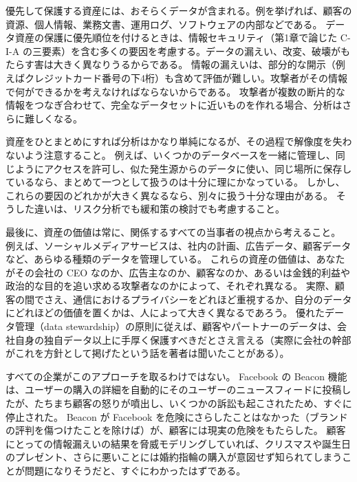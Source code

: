 \documentclass[uplatex]{jsarticle}
\def\label#1{}%
\begin{document}
優先して保護する資産には、おそらくデータが含まれる。例を挙げれば、顧客の資源、個人情報、業務文書、運用ログ、ソフトウェアの内部などである。
データ資産の保護に優先順位を付けるときは、情報セキュリティ（第1章で論じた C-I-A の三要素）を含む多くの要因を考慮する。データの漏えい、改変、破壊がもたらす害は大きく異なりうるからである。
情報の漏えいは、部分的な開示（例えばクレジットカード番号の下4桁）も含めて評価が難しい。攻撃者がその情報で何ができるかを考えなければならないからである。
攻撃者が複数の断片的な情報をつなぎ合わせて、完全なデータセットに近いものを作れる場合、分析はさらに難しくなる。

資産をひとまとめにすれば分析はかなり単純になるが、その過程で解像度を失わないよう注意すること。
例えば、いくつかのデータベースを一緒に管理し、同じようにアクセスを許可し、似た発生源からのデータに使い、同じ場所に保存しているなら、まとめて一つとして扱うのは十分に理にかなっている。
しかし、これらの要因のどれかが大きく異なるなら、別々に扱う十分な理由がある。
そうした違いは、リスク分析でも緩和策の検討でも考慮すること。

最後に、資産の価値は常に、関係するすべての当事者の視点から考えること。
例えば、ソーシャルメディアサービスは、社内の計画、広告データ、顧客データなど、あらゆる種類のデータを管理している。
これらの資産の価値は、あなたがその会社の CEO なのか、広告主なのか、顧客なのか、あるいは金銭的利益や政治的な目的を追い求める攻撃者なのかによって、それぞれ異なる。
実際、顧客の間でさえ、通信におけるプライバシーをどれほど重視するか、自分のデータにどれほどの価値を置くかは、人によって大きく異なるであろう。
優れたデータ管理（data stewardship）の原則に従えば、顧客やパートナーのデータは、会社自身の独自データ以上に手厚く保護すべきだとさえ言える（実際に会社の幹部がこれを方針として掲げたという話を著者は聞いたことがある）。

\begin{exa}\label{exa:ch2-facebook-beacon}
すべての企業がこのアプローチを取るわけではない。
Facebook の Beacon 機能は、ユーザーの購入の詳細を自動的にそのユーザーのニュースフィードに投稿したが、たちまち顧客の怒りが噴出し、いくつかの訴訟も起こされたため、すぐに停止された。
Beacon が Facebook を危険にさらしたことはなかった（ブランドの評判を傷つけたことを除けば）が、顧客には現実の危険をもたらした。
顧客にとっての情報漏えいの結果を脅威モデリングしていれば、クリスマスや誕生日のプレゼント、さらに悪いことには婚約指輪の購入が意図せず知られてしまうことが問題になりそうだと、すぐにわかったはずである。
\end{exa}

\end{document}
